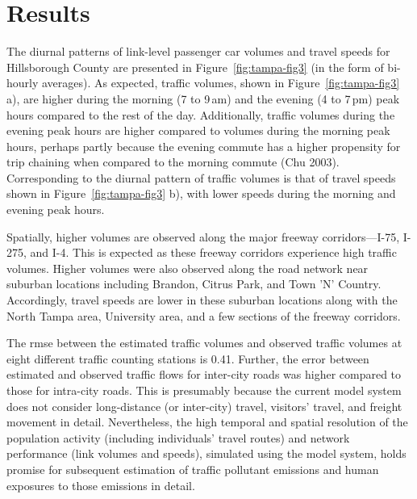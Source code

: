 \section{Results}
The diurnal patterns of link-level passenger car volumes and travel speeds for Hillsborough County are presented in Figure~\ref{fig:tampa-fig3} (in the form of bi-hourly averages). As expected, traffic volumes, shown in Figure~\ref{fig:tampa-fig3} a), are higher during the morning (7 to 9\,am) and the evening (4 to 7\,pm) peak hours compared to the rest of the day. Additionally, traffic volumes during the evening peak hours are higher compared to volumes during the morning peak hours, perhaps partly because the evening commute has a higher propensity for trip chaining when compared to the morning commute \citep[][]{}(Chu 2003). Corresponding to the diurnal pattern of traffic volumes is that of travel speeds shown in Figure~\ref{fig:tampa-fig3} b), with lower speeds during the morning and evening peak hours.

Spatially, higher volumes are observed along the major freeway corridors---I-75, I-275, and I-4. This is expected as these freeway corridors experience high traffic volumes. Higher volumes were also observed along the road network near suburban locations including Brandon, Citrus Park, and Town 'N' Country. Accordingly, travel speeds are lower in these suburban locations along with the North Tampa area, University area, and a few sections of the freeway corridors. 

The \gls{rmse} between the estimated traffic volumes and observed traffic volumes at eight different traffic counting stations is 0.41. Further, the error between estimated and observed traffic flows for inter-city roads was higher compared to those for intra-city roads. This is presumably because the current model system does not consider long-distance (or inter-city) travel, visitors' travel, and freight movement in detail. Nevertheless, the high temporal and spatial resolution of the population activity (including individuals' travel routes) and network performance (\ie link volumes and speeds), simulated using the model system, holds promise for subsequent estimation of traffic pollutant emissions and human exposures to those emissions in detail.  

